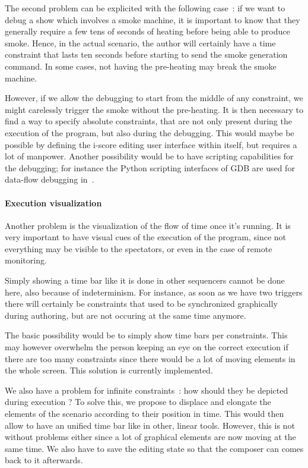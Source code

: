 \documentclass{sigchi}
\begin{document}
The second problem can be explicited with the following case~: if we want to debug a show which involves a smoke machine, it is important to know that they generally require a few tens of seconds of heating before being able to produce smoke. Hence, in the actual scenario, the author will certainly have a time constraint that lasts ten seconds before starting to send the smoke generation command. In some cases, not having the pre-heating may break the smoke machine.

However, if we allow the debugging to start from the middle of any constraint, we might carelessly trigger the smoke without the pre-heating. It is then necessary to find a way to specify absolute constraints, that are not only present during the execution of the program, but also during the debugging. This would maybe be possible by defining the i-score editing user interface within itself, but requires a lot of manpower. Another possibility would be to have scripting capabilities for the debugging; for instance the Python scripting interfaces of GDB are used for data-flow debugging in~\cite{pouget2013interactive}.

\paragraph{Execution visualization}
Another problem is the visualization of the flow of time once it's running. It is very important to have visual cues of the execution of the program, since not everything may be visible to the spectators, or even in the case of remote monitoring.

Simply showing a time bar like it is done in other sequencers cannot be done here, also because of indeterminism.
For instance, as soon as we have two triggers there will certainly be constraints that used to be synchronized graphically during authoring, but are not occuring at the same time anymore.

The basic possibility would be to simply show time bars per constraints. This may however overwhelm the person keeping an eye on the correct execution if there are too many constraints since there would be a lot of moving elements in the whole screen. This solution is currently implemented.

We also have a problem for infinite constraints~: how should they be depicted during execution ? To solve this, we propose to displace and elongate the elements of the scenario according to their position in time. This would then allow to have an unified time bar like in other, linear tools. However, 
this is not without problems either since a lot of graphical elements are now moving at the same time. We also have to save the editing state so that the composer can comes back to it afterwards.
\end{document}
